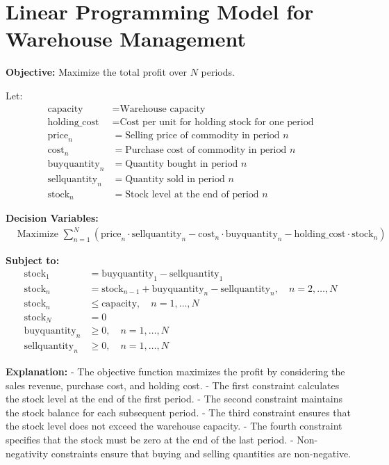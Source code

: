 \documentclass{article}
\begin{document}
\section*{Linear Programming Model for Warehouse Management}

\textbf{Objective:} Maximize the total profit over $N$ periods.

Let:
\begin{align*}
  \text{capacity} &= \text{Warehouse capacity} \\
  \text{holding\_cost} &= \text{Cost per unit for holding stock for one period} \\
  \text{price}_n &= \text{Selling price of commodity in period } n \\
  \text{cost}_n &= \text{Purchase cost of commodity in period } n \\
  \text{buyquantity}_n &= \text{Quantity bought in period } n \\
  \text{sellquantity}_n &= \text{Quantity sold in period } n \\
  \text{stock}_n &= \text{Stock level at the end of period } n
\end{align*}

\textbf{Decision Variables:}
\[
  \begin{aligned}
    & \text{Maximize } \sum_{n=1}^{N} \left( \text{price}_n \cdot \text{sellquantity}_n - \text{cost}_n \cdot \text{buyquantity}_n - \text{holding\_cost} \cdot \text{stock}_n \right)
  \end{aligned}
\]

\textbf{Subject to:}
\begin{align*}
  \text{stock}_1 &= \text{buyquantity}_1 - \text{sellquantity}_1 \\
  \text{stock}_n &= \text{stock}_{n-1} + \text{buyquantity}_n - \text{sellquantity}_n, \quad n = 2, \ldots, N \\
  \text{stock}_n &\leq \text{capacity}, \quad n = 1, \ldots, N \\
  \text{stock}_N &= 0 \\
  \text{buyquantity}_n &\geq 0, \quad n = 1, \ldots, N \\
  \text{sellquantity}_n &\geq 0, \quad n = 1, \ldots, N
\end{align*}

\textbf{Explanation:}
- The objective function maximizes the profit by considering the sales revenue, purchase cost, and holding cost.
- The first constraint calculates the stock level at the end of the first period.
- The second constraint maintains the stock balance for each subsequent period.
- The third constraint ensures that the stock level does not exceed the warehouse capacity.
- The fourth constraint specifies that the stock must be zero at the end of the last period.
- Non-negativity constraints ensure that buying and selling quantities are non-negative.
\end{document}
